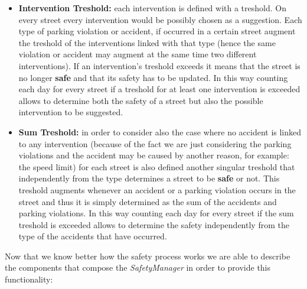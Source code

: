			\begin{itemize}
				\item \textbf{Intervention Treshold:} each intervention is defined with a treshold. On every street every intervention would be possibly chosen as a suggestion. Each type of parking violation or accident, if occurred in a certain street augment the treshold of the interventions linked with that type (hence the same violation or accident may augment at the same time two different interventions). If an intervention's treshold exceeds it means that the street is no longer \textbf{safe} and that its safety has to be updated. In this way counting each day for every street if a treshold for at least one intervention is exceeded allows to determine both the safety of a street but also the possible intervention to be suggested.
				
				\item \textbf{Sum Treshold:} in order to consider also the case where no accident is linked to any intervention (because of the fact we are just considering the parking violations and the accident may be caused by another reason, for example: the speed limit) for each street is also defined another singular treshold that independently from the type determines a street to be \textbf{safe} or not. This treshold augments whenever an accident or a parking violation occurs in the street and thus it is simply determined as the sum of the accidents and parking violations. In this way counting each day for every street if the sum treshold is exceeded allows to determine the safety independently from the type of the accidents that have occurred.
			\end{itemize}
		
			Now that we know better how the safety process works we are able to describe the components that compose the \emph{SafetyManager} in order to provide this functionality:
			

